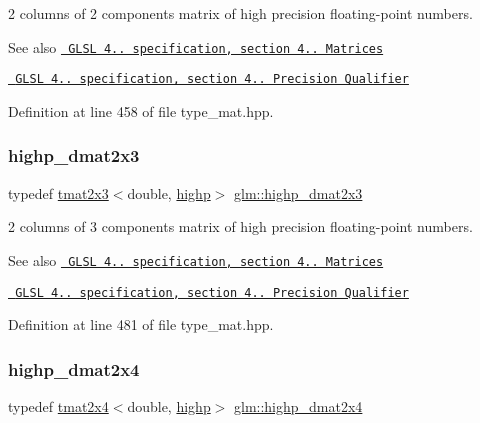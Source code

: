 2 columns of 2 components matrix of high precision floating-\/point numbers.

\begin{DoxySeeAlso}{See also}
\href{http://www.opengl.org/registry/doc/GLSLangSpec.4.20.8.pdf}{\texttt{ G\+L\+SL 4.. specification, section 4.. Matrices}} 

\href{http://www.opengl.org/registry/doc/GLSLangSpec.4.20.8.pdf}{\texttt{ G\+L\+SL 4.. specification, section 4.. Precision Qualifier}} 
\end{DoxySeeAlso}


Definition at line 458 of file type\+\_\+mat.\+hpp.

\mbox{\label{group__core__precision_ga29884defff6f7109b1e99ef8a6ce7e0a}} 
\subsubsection{\texorpdfstring{highp\_dmat2x3}{highp\_dmat2x3}}
{\footnotesize\ttfamily typedef \mbox{\hyperlink{structglm_1_1tmat2x3}{tmat2x3}}$<$double, \mbox{\hyperlink{namespaceglm_a0f04f086094c747d227af4425893f545ac6f7eab42eacbb10d59a58e95e362074}{highp}}$>$ \mbox{\hyperlink{group__core__precision_ga29884defff6f7109b1e99ef8a6ce7e0a}{glm\+::highp\+\_\+dmat2x3}}}

2 columns of 3 components matrix of high precision floating-\/point numbers.

\begin{DoxySeeAlso}{See also}
\href{http://www.opengl.org/registry/doc/GLSLangSpec.4.20.8.pdf}{\texttt{ G\+L\+SL 4.. specification, section 4.. Matrices}} 

\href{http://www.opengl.org/registry/doc/GLSLangSpec.4.20.8.pdf}{\texttt{ G\+L\+SL 4.. specification, section 4.. Precision Qualifier}} 
\end{DoxySeeAlso}


Definition at line 481 of file type\+\_\+mat.\+hpp.

\mbox{\label{group__core__precision_ga2b1bf87a8f8fbc895127c6bfde7a271e}} 
\subsubsection{\texorpdfstring{highp\_dmat2x4}{highp\_dmat2x4}}
{\footnotesize\ttfamily typedef \mbox{\hyperlink{structglm_1_1tmat2x4}{tmat2x4}}$<$double, \mbox{\hyperlink{namespaceglm_a0f04f086094c747d227af4425893f545ac6f7eab42eacbb10d59a58e95e362074}{highp}}$>$ \mbox{\hyperlink{group__core__precision_ga2b1bf87a8f8fbc895127c6bfde7a271e}{glm\+::highp\+\_\+dmat2x4}}}

